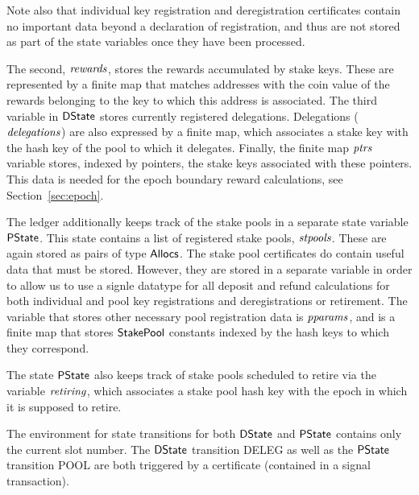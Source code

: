 Note also that individual key registration
and deregistration certificates contain no important data beyond a declaration
of registration, and thus are not stored as part of the state variables once
they have been processed.

The second, $\mathit{rewards}$, stores the
rewards accumulated by stake keys. These are represented by
a finite
map that matches addresses with the coin value of the rewards belonging to the
key to which this address is associated. The third
variable in $\mathsf{DState}$ stores currently registered delegations.
Delegations ($\mathit{delegations}$) are also expressed by a finite map, which
associates a stake key with the hash key of the pool to which it delegates.
Finally, the finite map $\mathit{ptrs}$ variable stores,
indexed by pointers,
the stake keys associated with these pointers. This data is needed for the
epoch boundary reward calculations, see Section~\ref{sec:epoch}.

The ledger additionally keeps track of the stake pools in a separate state variable
$\mathsf{PState}$.
This state contains a list of registered stake pools, $\mathit{stpools}$.
These are again stored as pairs of type $\mathsf{Allocs}$. The stake pool certificates
do contain useful data that must be stored. However, they are stored in a
separate variable in order to allow us to use a signle datatype for
all deposit and refund calculations for both individual and pool key registrations
and deregistrations or retirement. The variable that stores other necessary pool
registration data is $\mathit{pparams}$, and is a finite map that stores $\mathsf{StakePool}$
constants indexed
by the hash keys to which they correspond.

The state $\mathsf{PState}$ also keeps track of
stake pools scheduled to retire via the variable $\mathit{retiring}$,
which associates
a stake pool hash key with the epoch in which it is supposed to retire.

The environment for state transitions for both $\mathsf{DState}$ and $\mathsf{PState}$ contains
only the current slot number. The $\mathsf{DState}$ transition DELEG as well as
the $\mathsf{PState}$ transition POOL are both triggered by a
certificate (contained in a signal transaction).


